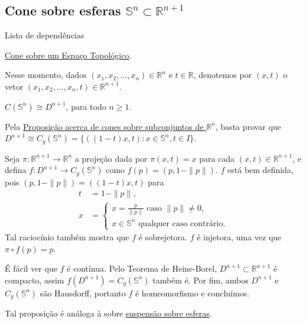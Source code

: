 \subsection{Cone sobre esferas $\mathbb{S}^n\subset\mathbb{R}^{n+1}$}
\label{cone-esfera-prop}
\begin{titlemize}{Lista de dependências}
	\item \hyperref[cone-def]{Cone sobre um Espaço Topológico}.
\end{titlemize}

Nesse momento, dados $(x_1,x_2,...,x_n) \in \mathbb{R}^n$ e $t \in \mathbb{R}$, denotemos por $(x,t)$ o vetor $(x_1,x_2,...,x_n,t) \in \mathbb{R}^{n+1}$.

\begin{prop}
	$C(\mathbb{S}^n) \cong D^{n+1}$, para todo $n\geq 1$.
 
    \begin{dem}
        Pela \hyperref[cone-euclidiano-prop]{Proposição acerca de cones sobre subconjuntos de $\mathbb{R}^n$}, basta provar que $D^{n+1}\cong C_g(\mathbb{S}^n) = \{((1-t)x,t):x\in \mathbb{S}^n, t\in I\}$.

        Seja $\pi:\mathbb{R}^{n+1}\to\mathbb{R}^n$ a projeção dada por $\pi(x,t) = x$ para cada $(x,t) \in \mathbb{R}^{n+1}$, e defina $f:D^{n+1}\to C_g(\mathbb{S}^n)$ como $f(p) = (p,1-\|p\|)$. $f$ está bem definida, pois $(p,1-\|p\|)=((1-t)x,t)$ para
        \begin{align*}
            t&=1-\|p\|,\\
            x&=\begin{cases}
                x= \frac{p}{\|p\|}\text{ caso }\|p\|\neq 0,\\
                x\in \mathbb{S}^n\text{ qualquer caso contrário}.
            \end{cases}
        \end{align*} Tal raciocínio também mostra que $f$ é sobrejetora. $f$ é injetora, uma vez que $\pi \circ f(p) = p$.

        É fácil ver que $f$ é contínua.  Pelo Teorema de Heine-Borel, $D^{n+1} \subset \mathbb{R}^{n+1}$ é compacto, assim $f(D^{n+1})=C_g(\mathbb{S}^n)$ também é. Por fim, ambos $D^{n+1}$ e $C_g(\mathbb{S}^n)$ são Hausdorff, portanto $f$ é homeomorfismo e concluímos. 
    \end{dem}
\end{prop}

Tal proposição é análoga à sobre \hyperref[suspensao-esfera-prop]{suspensão sobre esferas}.

